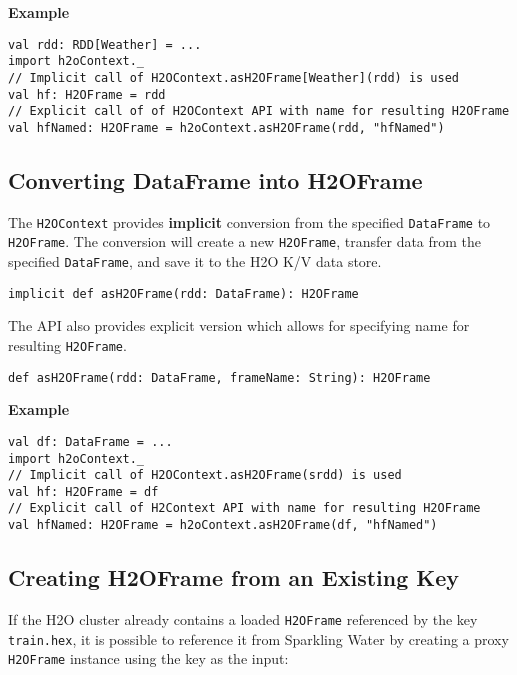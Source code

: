 \textbf{Example}

\begin{lstlisting}[style=Scala]
val rdd: RDD[Weather] = ...
import h2oContext._
// Implicit call of H2OContext.asH2OFrame[Weather](rdd) is used 
val hf: H2OFrame = rdd
// Explicit call of of H2OContext API with name for resulting H2OFrame
val hfNamed: H2OFrame = h2oContext.asH2OFrame(rdd, "hfNamed")
\end{lstlisting}

\subsection{Converting DataFrame into H2OFrame}

The \texttt{H2OContext} provides \textbf{implicit} conversion from the specified \texttt{DataFrame} to \texttt{H2OFrame}. The conversion will create a new \texttt{H2OFrame}, transfer data from the specified \texttt{DataFrame}, and save it to the H2O K/V data store.

\begin{lstlisting}[style=Scala]
implicit def asH2OFrame(rdd: DataFrame): H2OFrame
\end{lstlisting}

The API also provides explicit version which allows for specifying name for resulting \texttt{H2OFrame}.

\begin{lstlisting}[style=Scala]
def asH2OFrame(rdd: DataFrame, frameName: String): H2OFrame
\end{lstlisting}

\textbf{Example}

\begin{lstlisting}[style=Scala]
val df: DataFrame = ...
import h2oContext._
// Implicit call of H2OContext.asH2OFrame(srdd) is used 
val hf: H2OFrame = df 
// Explicit call of H2Context API with name for resulting H2OFrame
val hfNamed: H2OFrame = h2oContext.asH2OFrame(df, "hfNamed")
\end{lstlisting}

\subsection{Creating H2OFrame from an Existing Key}

If the H2O cluster already contains a loaded \texttt{H2OFrame} referenced by the key \texttt{train.hex}, it is possible to reference it from Sparkling Water by creating a proxy \texttt{H2OFrame} instance using the key as the input:

